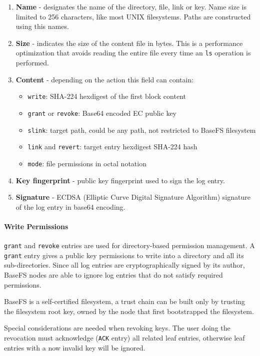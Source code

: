 \documentclass{sig-alternate}
\begin{document}
\begin{enumerate}
\item \textbf{Name} - designates the name of the directory, file, link or key. Name size is limited to 256 characters, like most UNIX filesystems. Paths are constructed using this names.
\item \textbf{Size} - indicates the size of the content file in bytes. This is a performance optimization that avoids reading the entire file every time an \texttt{ls} operation is performed.
\item \textbf{Content} - depending on the action this field can contain:
    \begin{itemize}
    \item \texttt{write}: SHA-224 hexdigest of the first block content
    \item \texttt{grant} or \texttt{revoke}: Base64 encoded EC public key
    \item \texttt{slink}: target path, could be any path, not restricted to BaseFS filesystem
    \item \texttt{link} and \texttt{revert}: target entry hexdigest SHA-224 hash
    \item \texttt{mode}: file permissions in octal notation
    \end{itemize}
\item \textbf{Key fingerprint} - public key fingerprint used to sign the log entry.
\item \textbf{Signature} - ECDSA (Elliptic Curve Digital Signature Algorithm) signature of the log entry in base64 encoding.
\end{enumerate}


\paragraph{Write Permissions}

\texttt{grant} and \texttt{revoke} entries are used for directory-based permission management. A \texttt{grant} entry gives a public key permissions to write into a directory and all its sub-directories. Since all log entries are cryptographically
signed by its author, BaseFS nodes are able to ignore log entries that do not satisfy required permissions. 

BaseFS is a self-certified filesystem, a trust chain can be built only by trusting the filesystem root key, owned by the node that first bootstrapped the filesystem.

Special considerations are needed when revoking keys. The user doing the revocation must acknowledge (\texttt{ACK} entry) all related leaf entries, otherwise leaf entries with a now invalid key will be ignored.
\end{document}
